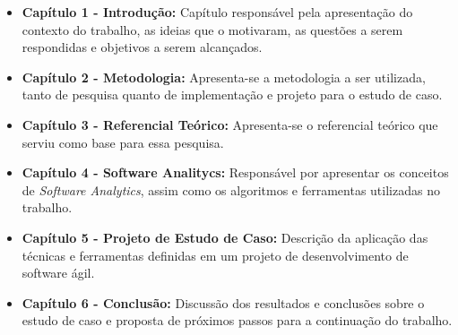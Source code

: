\begin{itemize}
    \item \textbf{Capítulo 1 - Introdução:} Capítulo responsável pela apresentação do contexto do trabalho, as ideias que o motivaram, as questões a serem respondidas e objetivos a serem alcançados.
    \item \textbf{Capítulo 2 - Metodologia:} Apresenta-se a metodologia a ser utilizada, tanto de pesquisa quanto de implementação e projeto para o estudo de caso.
    \item \textbf{Capítulo 3 - Referencial Teórico:} Apresenta-se o referencial teórico que serviu como base para essa pesquisa.
    \item \textbf{Capítulo 4 - Software Analitycs:} Responsável por apresentar os conceitos de \textit{Software Analytics}, assim como os algoritmos e ferramentas utilizadas no trabalho.
    \item \textbf{Capítulo 5 - Projeto de Estudo de Caso:} Descrição da aplicação das técnicas e ferramentas definidas em um projeto de desenvolvimento de software ágil.
    \item \textbf{Capítulo 6 - Conclusão:} Discussão dos resultados e conclusões sobre o estudo de caso e proposta de próximos passos para a continuação do trabalho.
\end{itemize}
